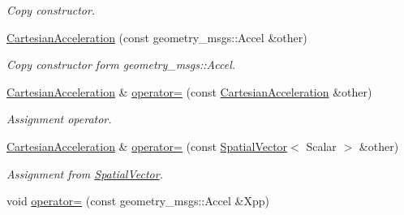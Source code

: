 \begin{DoxyCompactItemize}
\begin{DoxyCompactList}\small\item\em Copy constructor. \end{DoxyCompactList}\item 
\hyperlink{classow__core_1_1CartesianAcceleration_a00e9ba4327f15f4b81d520ff3c3b665c}{Cartesian\+Acceleration} (const geometry\+\_\+msgs\+::\+Accel \&other)\hypertarget{classow__core_1_1CartesianAcceleration_a00e9ba4327f15f4b81d520ff3c3b665c}{}\label{classow__core_1_1CartesianAcceleration_a00e9ba4327f15f4b81d520ff3c3b665c}

\begin{DoxyCompactList}\small\item\em Copy constructor form geometry\+\_\+msgs\+::\+Accel. \end{DoxyCompactList}\item 
\hyperlink{classow__core_1_1CartesianAcceleration}{Cartesian\+Acceleration} \& \hyperlink{classow__core_1_1CartesianAcceleration_a2d3bf19dd4a9decd91dd8b4ce77dc543}{operator=} (const \hyperlink{classow__core_1_1CartesianAcceleration}{Cartesian\+Acceleration} \&other)\hypertarget{classow__core_1_1CartesianAcceleration_a2d3bf19dd4a9decd91dd8b4ce77dc543}{}\label{classow__core_1_1CartesianAcceleration_a2d3bf19dd4a9decd91dd8b4ce77dc543}

\begin{DoxyCompactList}\small\item\em Assignment operator. \end{DoxyCompactList}\item 
\hyperlink{classow__core_1_1CartesianAcceleration}{Cartesian\+Acceleration} \& \hyperlink{classow__core_1_1CartesianAcceleration_a584550cc580076024f03b9c3c40d5b40}{operator=} (const \hyperlink{classow__core_1_1SpatialVector}{Spatial\+Vector}$<$ Scalar $>$ \&other)\hypertarget{classow__core_1_1CartesianAcceleration_a584550cc580076024f03b9c3c40d5b40}{}\label{classow__core_1_1CartesianAcceleration_a584550cc580076024f03b9c3c40d5b40}

\begin{DoxyCompactList}\small\item\em Assignment from \hyperlink{classow__core_1_1SpatialVector}{Spatial\+Vector}. \end{DoxyCompactList}\item 
void \hyperlink{classow__core_1_1CartesianAcceleration_ac69817340dd5fd1178764c75707739b9}{operator=} (const geometry\+\_\+msgs\+::\+Accel \&Xpp)\hypertarget{classow__core_1_1CartesianAcceleration_ac69817340dd5fd1178764c75707739b9}{}\label{classow__core_1_1CartesianAcceleration_ac69817340dd5fd1178764c75707739b9}


\end{DoxyCompactItemize}
